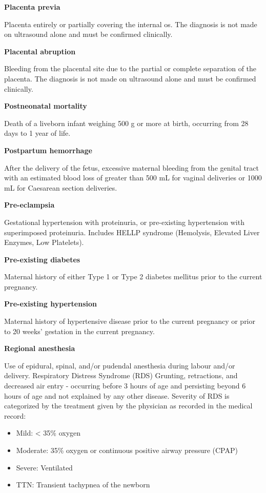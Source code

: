 \documentclass[
]{krantz}
\providecommand{\tightlist}{%
  \setlength{\itemsep}{0pt}\setlength{\parskip}{0pt}}
\begin{document}
\textbf{Placenta previa}

Placenta entirely or partially covering the internal os. The diagnosis is not made on ultrasound alone and must be confirmed clinically.

\textbf{Placental abruption}

Bleeding from the placental site due to the partial or complete separation of the placenta. The diagnosis is not made on ultrasound alone and must be confirmed clinically.

\textbf{Postneonatal mortality}

Death of a liveborn infant weighing 500 g or more at birth, occurring from 28 days to 1 year of life.

\textbf{Postpartum hemorrhage}

After the delivery of the fetus, excessive maternal bleeding from the genital tract with an estimated blood loss of greater than 500 mL for vaginal deliveries or 1000 mL for Caesarean section deliveries.

\textbf{Pre-eclampsia}

Gestational hypertension with proteinuria, or pre-existing hypertension with superimposed proteinuria. Includes HELLP syndrome (Hemolysis, Elevated Liver Enzymes, Low Platelets).

\textbf{Pre-existing diabetes}

Maternal history of either Type 1 or Type 2 diabetes mellitus prior to the current pregnancy.

\textbf{Pre-existing hypertension}

Maternal history of hypertensive disease prior to the current pregnancy or prior to 20 weeks' gestation in the current pregnancy.

\textbf{Regional anesthesia}

Use of epidural, spinal, and/or pudendal anesthesia during labour and/or delivery.
Respiratory Distress Syndrome (RDS) Grunting, retractions, and decreased air entry - occurring before 3 hours of age and persisting beyond 6 hours of age and not explained by any other disease. Severity of RDS is categorized by the treatment given by the physician as recorded in the medical record:

\begin{itemize}
\tightlist
\item
  Mild: \textless{} 35\% oxygen
\item
  Moderate: 35\% oxygen or continuous positive airway pressure (CPAP)
\item
  Severe: Ventilated
\item
  TTN: Transient tachypnea of the newborn
\end{itemize}
\end{document}
